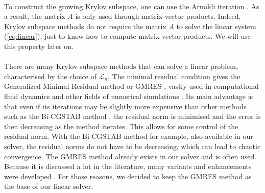       \paragraph{}
      To construct the growing Krylov subspace, one can use the Arnoldi iteration \cite{TrefethenBau1997}.
      As a result, the matrix $A$ is only used through matrix-vector products.
      Indeed, Krylov subspace methods do not require the matrix $A$ to solve the linear system (\ref{eq:linear}), just to know how to compute matrix-vector products.
      We will use this property later on.

      \paragraph{}
      There are many Krylov subspace methods that can solve a linear problem, characterised by the choice of $\mathcal{L}_n$.
      The minimal residual condition gives the Generalized Minimal Residual method or GMRES \cite{SaadSchultz1986}, vastly used in computational fluid dynamics \cite{FrancoCamierAndrejEtAl2020} and other fields of numerical simulations \cite{ErnstGander2012, Mercier2015}.
      Its main advantage is that even if its iterations may be slightly more expensive than other methods such as the Bi-CGSTAB method \cite{Vorst1992, TrefethenBau1997}, the residual norm is minimised and the error is then decreasing as the method iterates.
      This allows for some control of the residual norm.
      With the Bi-CGSTAB method for example, also available in our solver, the residual norms do not have to be decreasing, which can lead to chaotic convergence.
      The GMRES method already exists in our solver and is often used.
      Because it is discussed a lot in the literature, many variants and enhancements were developed \cite{CoulaudGiraudRametEtAl2013, Vasseur2016, JolivetTournier2016}.
      For those reasons, we decided to keep the GMRES method as the base of our linear solver.

